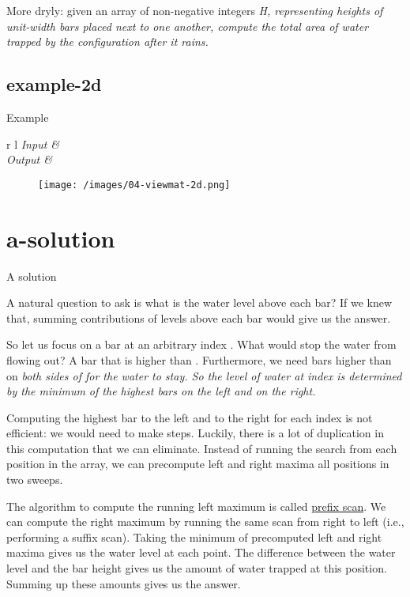 \documentclass{article}
\begin{document}
More dryly: given an array of non-negative integers \em{H}, representing heights of unit-width bars placed next to one another, compute the total area of water trapped by the configuration after it rains.

\subsection{example-2d}{Example}
\begin{tabular*}{r l}
    \em{Input} &  \\
    \em{Output} &  \\
\end{tabular*}

\begin{figure}
  \texttt{[image: /images/04-viewmat-2d.png]}
\end{figure}

\section{a-solution}{A solution}

A natural question to ask is what is the water level above each bar?
If we knew that, summing contributions of levels above each bar would give us the answer.

So let us focus on a bar at an arbitrary index .
What would stop the water from flowing out?
A bar that is higher than .
Furthermore, we need bars higher than  on \em{both} sides of  for the water to stay.
So the level of water at index  is determined by the minimum of the highest bars on the left and on the right.

Computing the highest bar to the left and to the right for each index is not efficient: we would need to make  steps.
Luckily, there is a lot of duplication in this computation that we can eliminate.
Instead of running the search from each position in the array, we can precompute left and right maxima all positions in two sweeps.

The algorithm to compute the running left maximum is called \href{https://en.wikipedia.org/wiki/Prefix_sum}{prefix scan}.
We can compute the right maximum by running the same scan from right to left (i.e., performing a suffix scan).
Taking the minimum of precomputed left and right maxima gives us the water level at each point.
The difference between the water level and the bar height gives us the amount of water trapped at this position.
Summing up these amounts gives us the answer.
\end{document}
